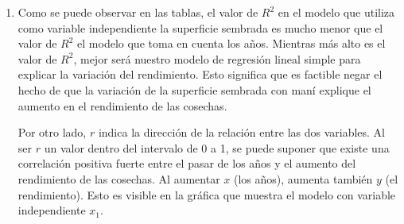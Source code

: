 \documentclass[spanish,12pt,a4paper]{article}
\begin{document}
\begin{enumerate}[label=\alph*)]
\begin{table}[h!]
\begin{adjustbox}{max width=\textwidth}
\begin{tabular}{|c|c|c|}
			\end{tabular}
			\egroup
			\end{adjustbox}
		\end{table}
		\begin{figure}[h!]
		\centering 
		\label{fig:tiempo}
		\end{figure}\clearpage
		\item Como se puede observar en las tablas, el valor de $R^2$ en el modelo que utiliza como variable independiente la superficie sembrada es mucho menor que el valor de $R^2$ el modelo que toma en cuenta los años. Mientras más alto es el valor de $R^2$, mejor será nuestro modelo de regresión lineal simple para explicar la variación del rendimiento. Esto significa que es factible negar el hecho de que la variación de la superficie sembrada con maní explique el aumento en el rendimiento de las cosechas.
		
		Por otro lado, $r$ indica la dirección de la relación entre las dos variables. Al ser $r$ un valor dentro del intervalo de 0 a 1, se puede suponer que existe una correlación positiva fuerte entre el pasar de los años y el aumento del rendimiento de las cosechas. Al aumentar $x$ (los años), aumenta también $y$ (el rendimiento). Esto es visible en la gráfica que muestra el modelo con variable independiente $x_1$.
		

\end{enumerate}
\end{document}
